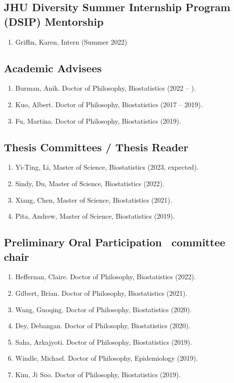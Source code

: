\documentclass[12pt]{article}
\newcommand{\dn}[1]{{\color{black} {#1}}}
\newcommand{\myben}[1]{\smallskip\begin{enumerate}[start=1,label={\scriptsize \arabic*$\ $},leftmargin=\parindent]\setlength{\itemsep}{#1}\vspace*{-0.7em}}
\newcommand{\ee}{\end{enumerate}}
\newcommand{\mylift}[1]{\vspace*{#1}}
\begin{document}
\subsection*{JHU Diversity Summer Internship Program (DSIP) Mentorship}

\myben{-0.1em}
\item Griffin, Karen, Intern (Summer 2022)

\ee

\mylift{-1.5em}

\subsection*{Academic Advisees}

\myben{-0.1em}

\item Burman, Anik. Doctor of Philosophy, Biostatistics (2022 -- ).
\item Kuo, Albert. Doctor of Philosophy, Biostatistics (2017 -- 2019).
\item Fu, Martina. Doctor of Philosophy, Biostatistics (2019).

\ee

\mylift{-1.5em}

\subsection*{Thesis Committees / Thesis Reader}

\myben{-0.1em}
\item Yi-Ting, Li, Master of Science, Biostatistics (2023, expected).
\item Sindy, Du, Master of Science, Biostatistics (2022).
\item Xiang, Chen, Master of Science, Biostatistics (2021).
\item \dn{Pita}, Andrew, Master of Science, Biostatistics (2019).
\ee

\mylift{-1.5em}

\subsection*{Preliminary Oral Participation \ \tiny * committee chair}

\myben{-0.1em}
\item \dn{Heffernan}, Claire. Doctor of Philosophy, Biostatistics (2022).
\item \dn{Gilbert}, Brian. Doctor of Philosophy, Biostatistics (2021).
\item \dn{Wang}, Guoqing. Doctor of Philosophy, Biostatistics (2020).
\item \dn{Dey}, Debangan. Doctor of Philosophy, Biostatistics (2020).
\item \dn{Saha}, Arkajyoti. Doctor of Philosophy, Biostatistics (2019).
\item \dn{Windle}, Michael. Doctor of Philosophy, Epidemiology (2019).
\item \dn{Kim}, Ji Soo. Doctor of Philosophy, Biostatistics (2019).
\ee
\end{document}
